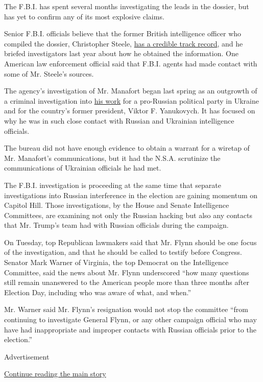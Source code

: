 The F.B.I. has spent several months investigating the leads in the
dossier, but has yet to confirm any of its most explosive claims.

Senior F.B.I. officials believe that the former British intelligence
officer who compiled the dossier, Christopher Steele,
\href{https://www.nytimes.com/2017/01/11/us/politics/donald-trump-russia-intelligence.html}{has
a credible track record}, and he briefed investigators last year about
how he obtained the information. One American law enforcement official
said that F.B.I. agents had made contact with some of Mr. Steele's
sources.

The agency's investigation of Mr. Manafort began last spring as an
outgrowth of a criminal investigation into
\href{https://www.nytimes.com/2016/08/01/us/paul-manafort-ukraine-donald-trump.html}{his
work} for a pro-Russian political party in Ukraine and for the country's
former president, Viktor F. Yanukovych. It has focused on why he was in
such close contact with Russian and Ukrainian intelligence officials.

The bureau did not have enough evidence to obtain a warrant for a
wiretap of Mr. Manafort's communications, but it had the N.S.A.
scrutinize the communications of Ukrainian officials he had met.

The F.B.I. investigation is proceeding at the same time that separate
investigations into Russian interference in the election are gaining
momentum on Capitol Hill. Those investigations, by the House and Senate
Intelligence Committees, are examining not only the Russian hacking but
also any contacts that Mr. Trump's team had with Russian officials
during the campaign.

On Tuesday, top Republican lawmakers said that Mr. Flynn should be one
focus of the investigation, and that he should be called to testify
before Congress. Senator Mark Warner of Virginia, the top Democrat on
the Intelligence Committee, said the news about Mr. Flynn underscored
``how many questions still remain unanswered to the American people more
than three months after Election Day, including who was aware of what,
and when.''

Mr. Warner said Mr. Flynn's resignation would not stop the committee
``from continuing to investigate General Flynn, or any other campaign
official who may have had inappropriate and improper contacts with
Russian officials prior to the election.''

Advertisement

\protect\hyperlink{after-bottom}{Continue reading the main story}

